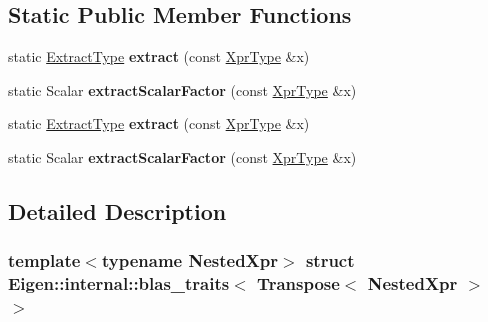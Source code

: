 \subsection*{Static Public Member Functions}
\begin{DoxyCompactItemize}
\item 
\mbox{\label{struct_eigen_1_1internal_1_1blas__traits_3_01_transpose_3_01_nested_xpr_01_4_01_4_a4263fd65419c2513eb9a6e1d45b21b86}} 
static \hyperlink{group___core___module_class_eigen_1_1_transpose}{Extract\+Type} {\bfseries extract} (const \hyperlink{group___core___module_class_eigen_1_1_transpose}{Xpr\+Type} \&x)
\item 
\mbox{\label{struct_eigen_1_1internal_1_1blas__traits_3_01_transpose_3_01_nested_xpr_01_4_01_4_adc4186cfbda6b18cc3b061212e42fb36}} 
static Scalar {\bfseries extract\+Scalar\+Factor} (const \hyperlink{group___core___module_class_eigen_1_1_transpose}{Xpr\+Type} \&x)
\item 
\mbox{\label{struct_eigen_1_1internal_1_1blas__traits_3_01_transpose_3_01_nested_xpr_01_4_01_4_a4263fd65419c2513eb9a6e1d45b21b86}} 
static \hyperlink{group___core___module_class_eigen_1_1_transpose}{Extract\+Type} {\bfseries extract} (const \hyperlink{group___core___module_class_eigen_1_1_transpose}{Xpr\+Type} \&x)
\item 
\mbox{\label{struct_eigen_1_1internal_1_1blas__traits_3_01_transpose_3_01_nested_xpr_01_4_01_4_adc4186cfbda6b18cc3b061212e42fb36}} 
static Scalar {\bfseries extract\+Scalar\+Factor} (const \hyperlink{group___core___module_class_eigen_1_1_transpose}{Xpr\+Type} \&x)
\end{DoxyCompactItemize}


\subsection{Detailed Description}
\subsubsection*{template$<$typename Nested\+Xpr$>$\newline
struct Eigen\+::internal\+::blas\+\_\+traits$<$ Transpose$<$ Nested\+Xpr $>$ $>$}



